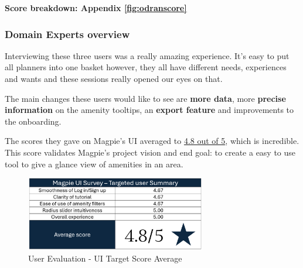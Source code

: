 \hspace{2em}\textbf{Score breakdown: Appendix \ref{fig:odranscore}}

\newpage{}

\subsubsection{Domain Experts overview}
Interviewing these three users was a really amazing experience. It's easy to put
all planners into one basket however, they all have different needs, experiences
and wants and these sessions really opened our eyes on that.

The main changes these users would like to see are \textbf{more data}, more
\textbf{precise information} on the amenity tooltips, an \textbf{export feature}
and improvements to the onboarding.

The scores they gave on Magpie's UI averaged to \underline{4.8 out of 5}, which
is incredible. This score validates Magpie's project vision and end goal: to
create a easy to use tool to give a glance view of amenities in an area.
\begin{figure}[h!]
    \centering
    \includegraphics[width=0.7\textwidth]{images/survey-target-summary.png}
    \caption{User Evaluation - UI Target Score Average}
\end{figure}
